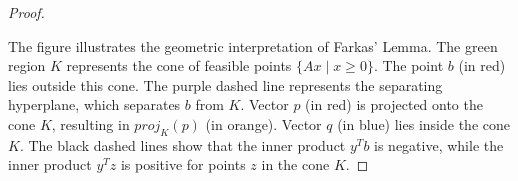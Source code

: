 \begin{proof}
\begin{center}
	\end{center}

	The figure illustrates the geometric interpretation of Farkas' Lemma. The green region \( K \) represents the cone of feasible points \( \{Ax \mid x \ge 0\} \). The point \( b \) (in red) lies outside this cone. The purple dashed line represents the separating hyperplane, which separates \( b \) from \( K \). Vector \( p \) (in red) is projected onto the cone \( K \), resulting in \( proj_K(p) \) (in orange). Vector \( q \) (in blue) lies inside the cone \( K \). The black dashed lines show that the inner product \( y^Tb \) is negative, while the inner product \( y^Tz \) is positive for points \( z \) in the cone \( K \).

\end{proof}


